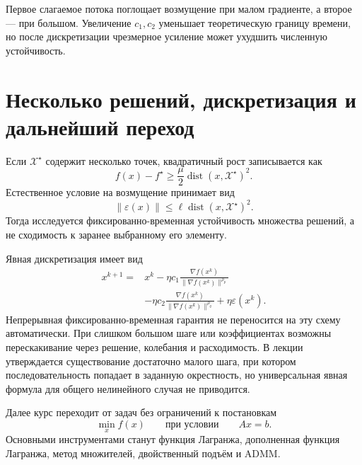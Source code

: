 Первое слагаемое потока поглощает возмущение при малом градиенте, а
второе --- при большом. Увеличение \(c_1,c_2\) уменьшает
теоретическую границу времени, но после дискретизации чрезмерное
усиление может ухудшить численную устойчивость.

\section{Несколько решений, дискретизация и дальнейший переход}

Если \(\mathcal X^\star\) содержит несколько точек, квадратичный рост
записывается как
\[
    f(x)-f^\star
    \ge
    \frac\mu2
    \operatorname{dist}(x,\mathcal X^\star)^2.
\]
Естественное условие на возмущение принимает вид
\[
    \lVert\varepsilon(x)\rVert
    \le
    \ell
    \operatorname{dist}(x,\mathcal X^\star)^2.
\]
Тогда исследуется фиксированно-временная устойчивость множества
решений, а не сходимость к заранее выбранному его элементу.

Явная дискретизация имеет вид
\[
\begin{aligned}
    x^{k+1}
    ={}&
    x^k
    -\eta c_1
    \frac{\nabla f(x^k)}{
        \lVert\nabla f(x^k)\rVert^{\rho_p}
    }
    \\
    &-\eta c_2
    \frac{\nabla f(x^k)}{
        \lVert\nabla f(x^k)\rVert^{\rho_q}
    }
    +\eta\varepsilon(x^k).
\end{aligned}
\]
Непрерывная фиксированно-временная гарантия не переносится на эту
схему автоматически. При слишком большом шаге или коэффициентах
возможны перескакивание через решение, колебания и расходимость. В
лекции утверждается существование достаточно малого шага, при котором
последовательность попадает в заданную окрестность, но универсальная
явная формула для общего нелинейного случая не приводится.

Далее курс переходит от задач без ограничений к постановкам
\[
    \min_x f(x)
    \qquad
    \text{при условии}
    \qquad
    Ax=b.
\]
Основными инструментами станут функция Лагранжа, дополненная функция
Лагранжа, метод множителей, двойственный подъём и ADMM.
